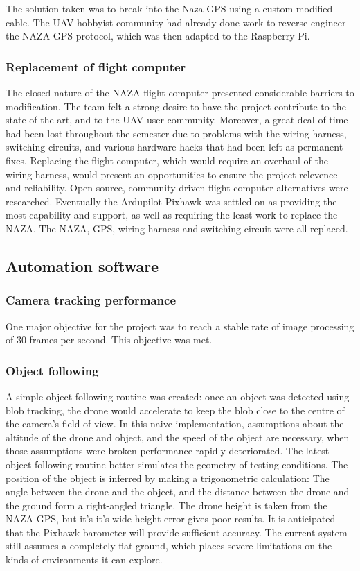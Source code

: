 \documentclass{article}
\begin{document}
The solution taken was to break into the Naza GPS using a custom modified cable. The UAV hobbyist community had already done work to reverse engineer the NAZA GPS protocol\cite{NAZArev}, which was then adapted to the Raspberry Pi.

		\subsubsection{Replacement of flight computer}
The closed nature of the NAZA flight computer presented considerable barriers to modification. The team felt a strong desire to have the project contribute to the state of the art, and to the UAV user community. Moreover, a great deal of time had been lost throughout the semester due to problems with the wiring harness, switching circuits, and various hardware hacks that had been left as permanent fixes. Replacing the flight computer, which would require an overhaul of the wiring harness, would present an opportunities to ensure the project relevence and reliability.
Open source, community-driven flight computer alternatives were researched. Eventually the Ardupilot Pixhawk was settled on as providing the most capability and support, as well as requiring the least work to replace the NAZA. The NAZA, GPS, wiring harness and switching circuit were all replaced.

	\subsection{Automation software}

		\subsubsection{Camera tracking performance}
One major objective for the project was to reach a stable rate of image processing of 30 frames per second. This objective was met.

		\subsubsection{Object following}
A simple object following routine was created: once an object was detected using blob tracking, the drone would accelerate to keep the blob close to the centre of the camera’s field of view. In this naive implementation, assumptions about  the altitude of the drone and object, and the speed of the object are necessary, when those assumptions were broken performance rapidly deteriorated.
The latest object following routine better simulates the geometry of testing conditions.  The position of the object is inferred by making a trigonometric calculation: The angle between the drone and the object, and the distance between the drone and the ground form a right-angled triangle. The drone height is taken from the NAZA GPS, but it’s it’s wide height error gives poor results. It is anticipated that the Pixhawk barometer will provide sufficient accuracy. 
The current system still assumes a completely flat ground, which places severe limitations on the kinds of environments it can explore.
\end{document}
